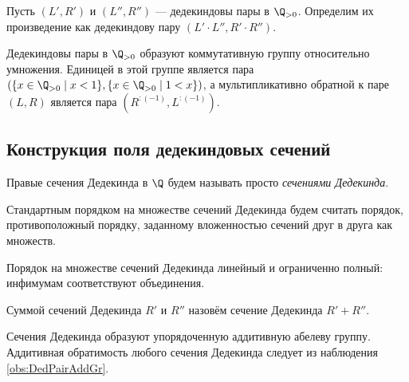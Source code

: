 \documentclass[
	extrafontsizes,
	11pt,
	hyphens,
]{memoir}
\begin{document}
\begin{definition}
Пусть \((L',R')\) и \((L'',R'')\) --- дедекиндовы пары в \(\Q_{>0}\).
Определим их произведение как дедекиндову пару
\((L' \cdot L'', R' \cdot R'')\).
\end{definition}

\begin{observation}
\label{obs:DedPairMultGr}
Дедекиндовы пары в \(\Q_{>0}\) образуют коммутативную группу относительно умножения.
Единицей в этой группе является пара
\((\{x \in \Q_{>0} \mid x < 1\}, \{x \in \Q_{>0} \mid 1 < x\})\),
а мультипликативно обратной к паре \((L,R)\) является пара \((R^{:(-1)}, L^{:(-1)})\).
\end{observation}

\subsection{Конструкция поля дедекиндовых сечений}

\begin{definition}
Правые сечения Дедекинда в \(\Q\) будем называть просто \emph{сечениями Дедекинда}.
\end{definition}

\begin{definition}
Стандартным порядком на множестве сечений Дедекинда будем считать порядок, противоположный порядку, заданному вложенностью сечений друг в друга как множеств.
\end{definition}

\begin{observation}
Порядок на множестве сечений Дедекинда линейный и ограниченно полный: инфимумам соответствуют объединения.
\end{observation}

\begin{definition}
Суммой сечений Дедекинда \(R'\) и \(R''\) назовём сечение Дедекинда \(R' + R''\).
\end{definition}

\begin{observation}
Сечения Дедекинда образуют упорядоченную аддитивную абелеву группу. Аддитивная обратимость любого сечения Дедекинда следует из наблюдения \ref{obs:DedPairAddGr}.
\end{observation}
\end{document}
